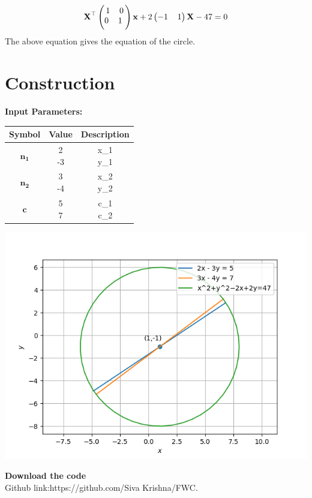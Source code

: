 \documentclass[10pt,a4paper]{report}
\newcommand{\myvec}[1]{\ensuremath{\begin{pmatrix}#1\end{pmatrix}}}
\let\vec\mathbf
\let\vec\mathbf
\begin{document}
\begin{multicols}{2}
\begin{align}
    \textbf{X}^\top \myvec{
    1 \hspace{4mm} 0 \\ \vspace{1mm}
    0 \hspace{4mm} 1 \
    }
    \textbf{x}+2\myvec{
    -1
    \hspace{4mm}
    1
    }\textbf{X} - 47 = 0
\end{align}
The above equation gives the equation of the circle.

\section{Construction}
\textbf{Input Parameters:}
\vspace{2mm}


\begin{tabular}{|c|c|c|}
	\hline
	\textbf{Symbol}&\textbf{Value}&\textbf{Description}\\
	\hline
	$\vec{n_1}$ &\myvec{2\\-3}& \myvec{x_1\\y_1}\\
	\hline
    $\vec{n_2}$ &\myvec{3\\-4}& \myvec{x_2\\y_2}\\
	\hline
    $\vec{c}$ &\myvec{5\\7}& \myvec{c_1\\c_2}\\
	\hline
\end{tabular}
\includegraphics[scale=0.35]{circle.png}  

 \textbf{Download the code} \\
Github link:{https://github.com/Siva Krishna/FWC}.
  \end{multicols}
\end{document}
